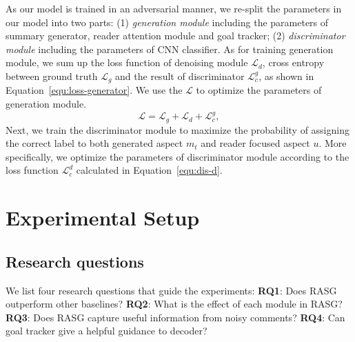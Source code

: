 \documentclass[letterpaper]{article} %
\begin{document}
As our model is trained in an adversarial manner, we re-split the parameters in our model into two parts: (1) \textit{generation module} including the parameters of summary generator, reader attention module and goal tracker; (2) \textit{discriminator module} including the parameters of CNN classifier.
As for training generation module, we sum up the loss function of denoising module $\mathcal{L}_d$, cross entropy between ground truth $\mathcal{L}_g$ and the result of discriminator $\mathcal{L}^g_c$, as shown in Equation~\ref{equ:loss-generator}.
We use the $\mathcal{L}$ to optimize the parameters of generation module.
\begin{equation}
    \mathcal{L} = \mathcal{L}_g + \mathcal{L}_d + \mathcal{L}^g_c , \label{equ:loss-generator}
\end{equation}
Next, we train the discriminator module to maximize the probability of assigning the correct label to both generated aspect $m_t$ and reader focused aspect $u$.
More specifically, we optimize the parameters of discriminator module according to the loss function $\mathcal{L}^d_c$ calculated in Equation~\ref{equ:dis-d}.

\section{Experimental Setup}

\subsection{Research questions}

We list four research questions that guide the experiments: 
\noindent \textbf{RQ1}: Does RASG outperform other baselines?
\noindent \textbf{RQ2}: What is the effect of each module in RASG? 
\noindent \textbf{RQ3}: Does RASG capture useful information from noisy comments?
\noindent \textbf{RQ4}: Can goal tracker give a helpful guidance to decoder?
\end{document}
